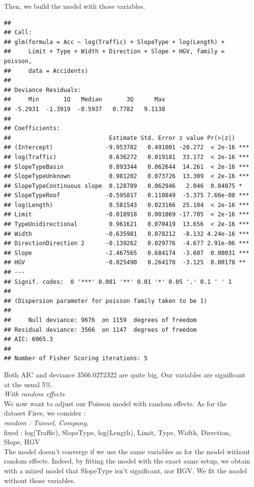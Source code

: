 \documentclass[
]{article}
\begin{document}
Then, we build the model with those variables.\\

\begin{verbatim}
## 
## Call:
## glm(formula = Acc ~ log(Traffic) + SlopeType + log(Length) + 
##     Limit + Type + Width + Direction + Slope + HGV, family = poisson, 
##     data = Accidents)
## 
## Deviance Residuals: 
##     Min       1Q   Median       3Q      Max  
## -5.2931  -1.3919  -0.5937   0.7782   9.1138  
## 
## Coefficients:
##                            Estimate Std. Error z value Pr(>|z|)    
## (Intercept)               -9.953782   0.491001 -20.272  < 2e-16 ***
## log(Traffic)               0.636272   0.019181  33.172  < 2e-16 ***
## SlopeTypeBasin             0.893344   0.062644  14.261  < 2e-16 ***
## SlopeTypeUnknown           0.981202   0.073726  13.309  < 2e-16 ***
## SlopeTypeContinuous slope  0.128789   0.062946   2.046  0.04075 *  
## SlopeTypeRoof             -0.595817   0.110849  -5.375 7.66e-08 ***
## log(Length)                0.581543   0.023166  25.104  < 2e-16 ***
## Limit                     -0.018918   0.001069 -17.705  < 2e-16 ***
## TypeUnidirectional         0.961621   0.070419  13.656  < 2e-16 ***
## Width                     -0.635981   0.078212  -8.132 4.24e-16 ***
## DirectionDirection 2      -0.139262   0.029776  -4.677 2.91e-06 ***
## Slope                     -2.467565   0.684174  -3.607  0.00031 ***
## HGV                       -0.825490   0.264178  -3.125  0.00178 ** 
## ---
## Signif. codes:  0 '***' 0.001 '**' 0.01 '*' 0.05 '.' 0.1 ' ' 1
## 
## (Dispersion parameter for poisson family taken to be 1)
## 
##     Null deviance: 9676  on 1159  degrees of freedom
## Residual deviance: 3566  on 1147  degrees of freedom
## AIC: 6065.3
## 
## Number of Fisher Scoring iterations: 5
\end{verbatim}

Both AIC and deviance 3566.0272322 are quite big. Our variables are
significant at the usual 5\%.\\

\emph{With random effects}\\
We now want to adjust our Poisson model with random effects. As for the
dataset Fires, we consider :\\
\emph{random : Tunnel, Company,\\
}fixed : log(Traffic), SlopeType, log(Length), Limit, Type, Width,
Direction, Slope, HGV\\

The model doesn't converge if we use the same variables as for the model
without random effects. Indeed, by fitting the model with the exact same
setup, we obtain with a mixed model that SlopeType isn't significant,
nor HGV. We fit the model without those variables.\\
\end{document}
